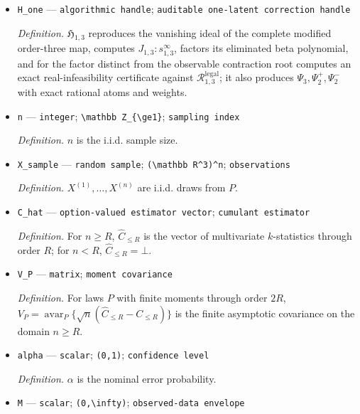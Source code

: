 \documentclass{article}
\begin{document}
\begin{itemize}
  \item \texttt{H\_\allowbreak{}one} --- \texttt{algorithmic handle}; \texttt{auditable one-\allowbreak{}latent correction handle}
  \par\smallskip\noindent\emph{Definition.} \(\mathfrak H_{1,3}\) reproduces the vanishing ideal of the complete modified order-three map, computes \(J_{1,3}:s_{1,3}^{\infty}\), factors its eliminated beta polynomial, and for the factor distinct from the observable contraction root computes an exact real-infeasibility certificate against \(\mathcal R^{\mathrm{legal}}_{1,3}\); it also produces \(\Psi_3,\Psi_2^{+},\Psi_2^{-}\) with exact rational atoms and weights.
  \item \texttt{n} --- \texttt{integer}; \texttt{\textbackslash{}\allowbreak{}mathbb Z\_\allowbreak{}\{\textbackslash{}\allowbreak{}ge1\}\allowbreak{}}; \texttt{sampling index}
  \par\smallskip\noindent\emph{Definition.} \(n\) is the i.i.d. sample size.
  \item \texttt{X\_\allowbreak{}sample} --- \texttt{random sample}; \texttt{(\textbackslash{}\allowbreak{}mathbb R\textasciicircum{}3)\textasciicircum{}n}; \texttt{observations}
  \par\smallskip\noindent\emph{Definition.} \(X^{(1)},\ldots,X^{(n)}\) are i.i.d. draws from \(P\).
  \item \texttt{C\_\allowbreak{}hat} --- \texttt{option-\allowbreak{}valued estimator vector}; \texttt{cumulant estimator}
  \par\smallskip\noindent\emph{Definition.} For \(n\ge R\), \(\widehat C_{\le R}\) is the vector of multivariate \(k\)-statistics through order \(R\); for \(n<R\), \(\widehat C_{\le R}=\bot\).
  \item \texttt{V\_\allowbreak{}P} --- \texttt{matrix}; \texttt{moment covariance}
  \par\smallskip\noindent\emph{Definition.} For laws \(P\) with finite moments through order \(2R\), \(V_P=\operatorname{avar}_P\{\sqrt n(\widehat C_{\le R}-C_{\le R})\}\) is the finite asymptotic covariance on the domain \(n\ge R\).
  \item \texttt{alpha} --- \texttt{scalar}; \texttt{(0,\allowbreak{}1)}; \texttt{confidence level}
  \par\smallskip\noindent\emph{Definition.} \(\alpha\) is the nominal error probability.
  \item \texttt{M} --- \texttt{scalar}; \texttt{(0,\allowbreak{}\textbackslash{}\allowbreak{}infty)}; \texttt{observed-\allowbreak{}data envelope}

\end{itemize}
\end{document}
